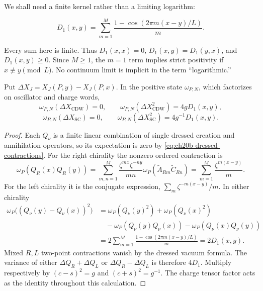 We shall need a finite kernel rather than a limiting logarithm:
\begin{definition}
\label{def:ch20b-D1}
\begin{equation}
 D_1(x,y)=\sum_{m=1}^{M}\frac{1-\cos(2\pi m(x-y)/L)}{m}.
 \label{eq:ch20b-D1}
\end{equation}
\end{definition}
Every sum here is finite.  Thus \(D_1(x,x)=0\),
\(D_1(x,y)=D_1(y,x)\), and \(D_1(x,y)\geq0\).
Since \(M\geq1\), the \(m=1\) term implies strict positivity if
\(x\not\equiv y\pmod L\).  No continuum limit is implicit in the
term ``logarithmic.''

\begin{proposition}
\label{prop:ch20b-variance}
Put \(\Delta X_J=X_J(P,y)-X_J(P,x)\).  In the positive state
\(\omega_{P,N}\), which factorizes on oscillator and charge words,
\begin{equation}
 \omega_{P,N}(\Delta X_{\mathrm{CDW}})=0,
 \qquad\omega_{P,N}(\Delta X_{\mathrm{CDW}}^2)=4gD_1(x,y),
 \label{eq:ch20b-variance-cdw}
\end{equation}
\begin{equation}
 \omega_{P,N}(\Delta X_{\mathrm{SC}})=0,
 \qquad\omega_{P,N}(\Delta X_{\mathrm{SC}}^2)
       =4g^{-1}D_1(x,y).
 \label{eq:ch20b-variance-sc}
\end{equation}
\end{proposition}
\begin{proof}
Each \(Q_\nu\) is a finite linear combination of single dressed
creation and annihilation operators, so its expectation is zero by
\eqref{eq:ch20b-dressed-contractions}.  For the right chirality the
nonzero ordered contraction is
\[
 \omega_P(Q_R(x)Q_R(y))
 =\sum_{m,n=1}^M\frac{\zeta^{mx}\zeta^{-ny}}{mn}
   \omega_P(\widetilde A_{Rm}\widetilde C_{Rn})
 =\sum_{m=1}^M\frac{\zeta^{m(x-y)}}{m}.
\]
For the left chirality it is the conjugate expression,
\(\sum_m\zeta^{-m(x-y)}/m\).  In either chirality
\begin{align*}
 \omega_P\bigl((Q_\nu(y)-Q_\nu(x))^2\bigr)
 &=\omega_P(Q_\nu(y)^2)+\omega_P(Q_\nu(x)^2)\\
 &\quad-\omega_P(Q_\nu(y)Q_\nu(x))
       -\omega_P(Q_\nu(x)Q_\nu(y))\\
 &=2\sum_{m=1}^M\frac{1-\cos(2\pi m(x-y)/L)}m
 =2D_1(x,y).
\end{align*}
Mixed \(R,L\) two-point contractions vanish by the dressed vacuum
formula.  The variance of either \(\Delta Q_R+\Delta Q_L\) or
\(\Delta Q_R-\Delta Q_L\) is therefore \(4D_1\).
Multiply respectively by \((c-s)^2=g\) and
\((c+s)^2=g^{-1}\).  The charge tensor factor acts as the identity
throughout this calculation.
\end{proof}

